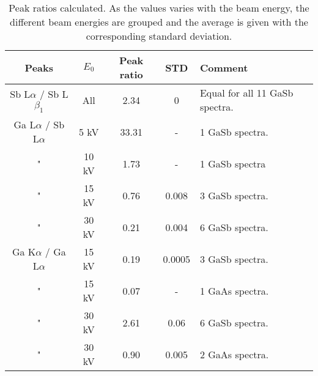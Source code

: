 \begin{table}[phtb]
    \begin{center}
        \caption{
            Peak ratios calculated.
            As the values varies with the beam energy, the different beam energies are grouped and the average is given with the corresponding standard deviation.
        }
        \renewcommand*{\arraystretch}{1.3}
        \label{tab:results:peak_ratios}
        \begin{tabular}{ccccl}
            \hline
            \textbf{Peaks}               & \textbf{$E_0$} & \textbf{Peak ratio} & \textbf{STD} & \textbf{Comment}               \\
            \hline
            Sb L$\alpha$ / Sb L$\beta_1$ & All            & 2.34                & 0            & Equal for all 11 GaSb spectra. \\
            Ga L$\alpha$ / Sb L$\alpha$  & 5 kV           & 33.31               & -            & 1 GaSb spectra.                \\
            "                            & 10 kV          & 1.73                & -            & 1 GaSb spectra                 \\
            "                            & 15 kV          & 0.76                & 0.008        & 3 GaSb spectra.                \\
            "                            & 30 kV          & 0.21                & 0.004        & 6 GaSb spectra.                \\
            Ga K$\alpha$ / Ga L$\alpha$  & 15 kV          & 0.19                & 0.0005       & 3 GaSb spectra.                \\
            "                            & 15 kV          & 0.07                & -            & 1 GaAs spectra.                \\
            "                            & 30 kV          & 2.61                & 0.06         & 6 GaSb spectra.                \\
            "                            & 30 kV          & 0.90                & 0.005        & 2 GaAs spectra.                \\
            \hline
        \end{tabular}
    \end{center}
\end{table}

